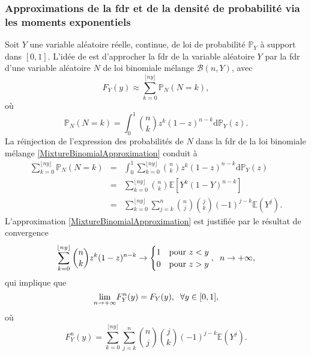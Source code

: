 \subsubsection{Approximations de la \gls{fdr} et de la densité de probabilité via les moments exponentiels}
Soit $Y$ une variable aléatoire réelle, continue, de loi de probabilité $\mathbb{P}_{Y}$ à support dans $[0,1]$. L\rq{}idée de \citet{MnRu03} est d\rq{}approcher la \gls{fdr} de la variable aléatoire $Y$ par la \gls{fdr} d\rq{}une variable aléatoire $N$ de loi binomiale mélange $\mathcal{B}(n,Y)$, avec
\begin{equation}\label{MixtureBinomialApproximation}
F_{Y}(y)\approx \sum^{\lfloor{ny}\rfloor}_{k=0}\mathbb{P}_{N}(N=k),
\end{equation}
où
\begin{equation}\label{ProbabilityMixtureBinomial}
\mathbb{P}_{N}(N=k)=\int_{0}^{1}\binom{n}{k}z^{k}(1-z)^{n-k}\text{d}\mathbb{P}_{Y}(z).
\end{equation}
La réinjection de l\rq{}expression des probabilités de $N$ dans la \gls{fdr} de la loi binomiale mélange \eqref{MixtureBinomialApproximation} conduit à 
\begin{eqnarray}
\sum^{\lfloor{ny}\rfloor}_{k=0}\mathbb{P}_{N}(N=k)&=&\int_{0}^{1}\sum^{\lfloor{ny}\rfloor}_{k=0}\binom{n}{k}z^{k}(1-z)^{n-k}\text{d}\mathbb{P}_{Y}(z)\label{ConvergenceReinjection}\\
&=&\sum^{\lfloor{ny}\rfloor}_{k=0}\binom{n}{k}\mathbb{E}\left[Y^{k}(1-Y)^{n-k}\right]\nonumber\\
&=&\sum^{\lfloor{ny}\rfloor}_{k=0}\sum_{j=k}^{n}\binom{n}{j}\binom{j}{k}(-1)^{j-k}\mathbb{E}\left(Y^{j}\right).\nonumber
\end{eqnarray}
L\rq{}approximation \eqref{MixtureBinomialApproximation} est justifiée par le résultat de convergence 
\begin{equation}
\sum^{\lfloor{ny}\rfloor}_{k=0}\binom{n}{k}z^{k}(1-z)^{n-k}\rightarrow
\begin{cases} 
1 &\mbox{pour }z<y \\ 
 0& \mbox{pour } z>y 
\end{cases},\hspace{0.2cm}n\rightarrow+\infty,
\end{equation} 
qui implique que 
\begin{equation*}
\underset{n\rightarrow+\infty}{\lim}F_{Y}^{n}(y) = F_{Y}(y),\hspace{0.2cm} \forall y\in [0,1],
\end{equation*}
où
\begin{equation}\label{MomentFdrApproximation}
F_{Y}^{n}(y)=\sum^{\lfloor{ny}\rfloor}_{k=0}\sum_{j=k}^{n}\binom{n}{j}\binom{j}{k}(-1)^{j-k}\mathbb{E}\left(Y^{j}\right).
\end{equation}
